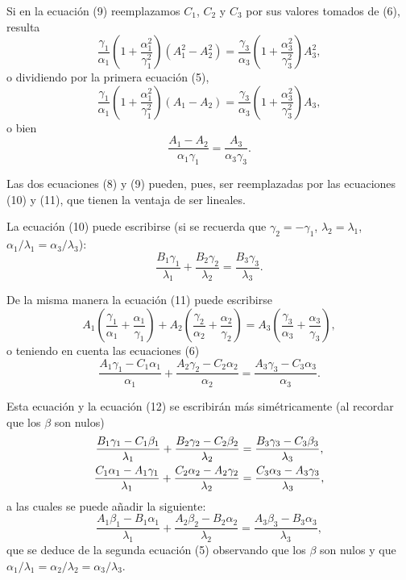 Si en la ecuación (9) reemplazamos $C_1$, $C_2$ y $C_3$ por sus valores
tomados de (6), resulta
\[
\frac{\gamma_1}{\alpha_1}\left(1+\frac{\alpha_1^2}{\gamma_1^2}\right)(A_1^2-A_2^2)
=\frac{\gamma_3}{\alpha_3}\left(1+\frac{\alpha_3^2}{\gamma_3^2}\right)A_3^2,
\]
o dividiendo por la primera ecuación (5),
\[
\frac{\gamma_1}{\alpha_1}\left(1+\frac{\alpha_1^2}{\gamma_1^2}\right)(A_1-A_2)
=\frac{\gamma_3}{\alpha_3}\left(1+\frac{\alpha_3^2}{\gamma_3^2}\right)A_3,
\]
o bien
\begin{equation}
\frac{A_1-A_2}{\alpha_1\gamma_1}=\frac{A_3}{\alpha_3\gamma_3}.
\end{equation}

Las dos ecuaciones (8) y (9) pueden, pues, ser reemplazadas por las
ecuaciones (10) y (11), que tienen la ventaja de ser lineales.

La ecuación (10) puede escribirse (si se recuerda que
$\gamma_2=-\gamma_1$, $\lambda_2=\lambda_1$, $\alpha_1/\lambda_1=\alpha_3/\lambda_3$):
\begin{equation}
\frac{B_1\gamma_1}{\lambda_1}+\frac{B_2\gamma_2}{\lambda_2}
=\frac{B_3\gamma_3}{\lambda_3}.
\end{equation}

De la misma manera la ecuación (11) puede escribirse
\[
A_1\left(\frac{\gamma_1}{\alpha_1}+\frac{\alpha_1}{\gamma_1}\right)
+A_2\left(\frac{\gamma_2}{\alpha_2}+\frac{\alpha_2}{\gamma_2}\right)
=A_3\left(\frac{\gamma_3}{\alpha_3}+\frac{\alpha_3}{\gamma_3}\right),
\]
o teniendo en cuenta las ecuaciones (6)
\[
\frac{A_1\gamma_1-C_1\alpha_1}{\alpha_1}
+\frac{A_2\gamma_2-C_2\alpha_2}{\alpha_2}
=\frac{A_3\gamma_3-C_3\alpha_3}{\alpha_3}.
\]

Esta ecuación y la ecuación (12) se escribirán más simétricamente (al
recordar que los $\beta$ son nulos)
\begin{align}
\frac{B_1\gamma_1-C_1\beta_1}{\lambda_1}
+\frac{B_2\gamma_2-C_2\beta_2}{\lambda_2}
&=\frac{B_3\gamma_3-C_3\beta_3}{\lambda_3},\notag\\
\frac{C_1\alpha_1-A_1\gamma_1}{\lambda_1}
+\frac{C_2\alpha_2-A_2\gamma_2}{\lambda_2}
&=\frac{C_3\alpha_3-A_3\gamma_3}{\lambda_3},
\end{align}
a las cuales se puede añadir la siguiente:
\[
\frac{A_1\beta_1-B_1\alpha_1}{\lambda_1}
+\frac{A_2\beta_2-B_2\alpha_2}{\lambda_2}
=\frac{A_3\beta_3-B_3\alpha_3}{\lambda_3},
\]
que se deduce de la segunda ecuación (5) observando que los $\beta$ son
nulos y que $\alpha_1/\lambda_1=\alpha_2/\lambda_2=\alpha_3/\lambda_3$.

